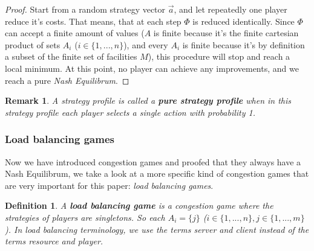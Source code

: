 \documentclass[a4paper,11pt]{article}
\newtheorem{definition}[theorem]{Definition}
\newtheorem{remark}[theorem]{Remark}
\begin{document}
\begin{proof}
Start from a random strategy vector $\vec{a}$, and let repeatedly one player reduce it's costs. That means, that at each step $\Phi$ is reduced identically. Since $\Phi$ can accept a finite amount of values ($A$ is finite because it's the finite cartesian product of sets $A_i$ ($i \in \{1,...,n\}$), and every $A_i$ is finite because it's by definition a subset of the finite set of facilities $M$), this procedure will stop and reach a local minimum. At this point, no player can achieve any improvements, and we reach a pure \emph{Nash Equilibrum}.
\end{proof}

\begin{remark}
A strategy profile is called a \textbf{pure strategy profile} when in this strategy profile each player selects a single action with probability 1. 
\end{remark}
\subsubsection{Load balancing games}
Now we have introduced congestion games and proofed that they always have a Nash Equilibrum, we take a look at a more specific kind of congestion games that are very important for this paper: \emph{load balancing games}. 

\begin{definition}\cite{9}
A \textbf{load balancing game} is a congestion game where the strategies of players are singletons. So each $A_i = \{j\}$ ($i \in \{1,...,n\}, j \in \{1,...,m\}$). In load balancing terminology, we use the terms \emph{server} and \emph{client} instead of the terms resource and player.
\end{definition}
\end{document}
